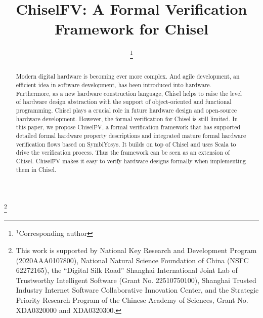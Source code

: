 \documentclass[conference]{IEEEtran}
\theoremstyle{definition}
\newcommand\blfootnote[1]{%
  \begingroup
  \renewcommand\thefootnote{}\footnote{#1}%
  \addtocounter{footnote}{-1}%
  \endgroup
}
\begin{document}
\title{ChiselFV: A Formal Verification Framework for Chisel
}

\author{
\and
{}
\and
{}
\thanks{$^1$Corresponding author}
}

\maketitle

\blfootnote{
    This work is supported by National Key Research and Development Program (2020AAA0107800), National Natural Science Foundation of China (NSFC 62272165), the “Digital Silk Road” Shanghai International Joint Lab of Trustworthy Intelligent Software (Grant No. 22510750100), Shanghai Trusted Industry Internet Software Collaborative Innovation Center, and the Strategic Priority Research Program of the Chinese Academy of Sciences, Grant No. XDA0320000 and XDA0320300.
}

\begin{abstract}
    Modern digital hardware is becoming ever more complex. And agile development, an efficient idea in software development, has been introduced into hardware. Furthermore, as a new hardware construction language, Chisel helps to raise the level of hardware design abstraction with the support of object-oriented and functional programming. Chisel plays a crucial role in future hardware design and open-source hardware development. However, the formal verification for Chisel is still limited. In this paper, we propose ChiselFV, a formal verification framework that has supported detailed formal hardware property descriptions and integrated mature formal hardware verification flows based on SymbiYosys. It builds on top of Chisel and uses Scala to drive the verification process. Thus the framework can be seen as an extension of Chisel. ChiselFV makes it easy to verify hardware designs formally when implementing them in Chisel.
\end{abstract}
\end{document}

